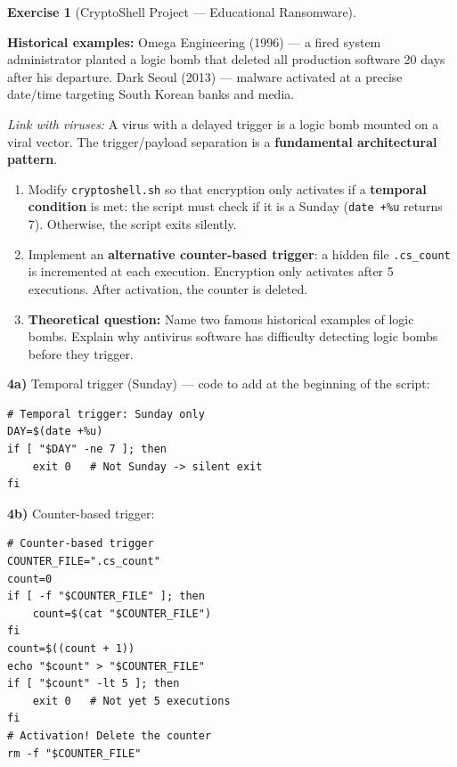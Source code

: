 \documentclass[a4paper,11pt]{article}
\theoremstyle{plain}
\theoremstyle{definition}
\newtheorem{exercice}{Exercise}
\begin{document}
\begin{exercice}[CryptoShell Project --- Educational Ransomware]
\begin{rappel}
\medskip
\textbf{Historical examples:} Omega Engineering (1996) --- a fired system administrator planted a logic bomb that deleted all production software 20 days after his departure. Dark Seoul (2013) --- malware activated at a precise date/time targeting South Korean banks and media.

\medskip
\textit{Link with viruses:} A virus with a delayed trigger is a logic bomb mounted on a viral vector. The trigger/payload separation is a \textbf{fundamental architectural pattern}.
\end{rappel}

\begin{enumerate}
\item[\textbf{4a)}] Modify \texttt{cryptoshell.sh} so that encryption only activates if a \textbf{temporal condition} is met: the script must check if it is a Sunday (\texttt{date +\%u} returns 7). Otherwise, the script exits silently.

\item[\textbf{4b)}] Implement an \textbf{alternative counter-based trigger}: a hidden file \texttt{.cs\_count} is incremented at each execution. Encryption only activates after 5 executions. After activation, the counter is deleted.

\item[\textbf{4c)}] \textbf{Theoretical question:} Name two famous historical examples of logic bombs. Explain why antivirus software has difficulty detecting logic bombs before they trigger.
\end{enumerate}

\begin{correction}

\textbf{4a)} Temporal trigger (Sunday) --- code to add at the beginning of the script:
\begin{lstlisting}[title=Temporal trigger]
# Temporal trigger: Sunday only
DAY=$(date +%u)
if [ "$DAY" -ne 7 ]; then
    exit 0   # Not Sunday -> silent exit
fi
\end{lstlisting}

\textbf{4b)} Counter-based trigger:
\begin{lstlisting}[title=Counter-based trigger]
# Counter-based trigger
COUNTER_FILE=".cs_count"
count=0
if [ -f "$COUNTER_FILE" ]; then
    count=$(cat "$COUNTER_FILE")
fi
count=$((count + 1))
echo "$count" > "$COUNTER_FILE"
if [ "$count" -lt 5 ]; then
    exit 0   # Not yet 5 executions
fi
# Activation! Delete the counter
rm -f "$COUNTER_FILE"
\end{lstlisting}


\end{correction}
\end{exercice}
\end{document}
